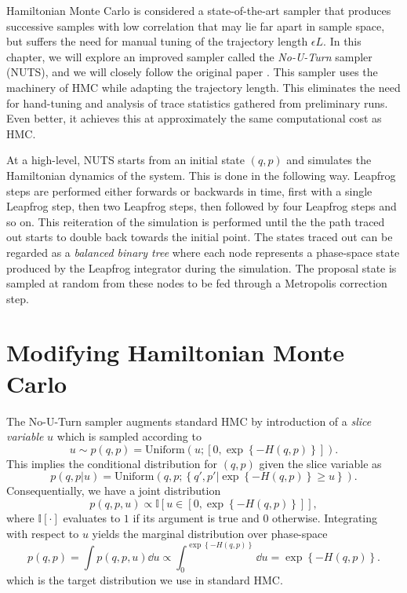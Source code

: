 Hamiltonian Monte Carlo is considered a state-of-the-art sampler that produces successive samples with low correlation
that may lie far apart in sample space, 
but suffers the need for manual tuning of the trajectory length $\epsilon L$. 
In this chapter, we will explore an improved sampler called the \textit{No-U-Turn} sampler (NUTS), and we will closely follow the original paper \cite{nuts}. This sampler uses the machinery of HMC while adapting the trajectory length. This eliminates the need for hand-tuning and analysis of trace statistics gathered from preliminary runs. Even better, it achieves this at approximately the same computational cost as HMC. 

At a high-level, NUTS starts from an initial state $(q, p)$ and simulates the Hamiltonian dynamics of the system. This is
done in the following way. Leapfrog steps are performed either forwards or backwards in time, first with a single Leapfrog step, then two Leapfrog steps, then followed by four Leapfrog steps and so on. This reiteration of the simulation is performed until the the path traced out starts to double back towards the initial point. The states traced out can be regarded as a \textit{balanced binary tree} where
each node represents a phase-space state produced by the Leapfrog integrator during the simulation. The proposal state is sampled at random from these nodes to be fed through a Metropolis correction step. 



\section{Modifying Hamiltonian Monte Carlo}
The No-U-Turn sampler augments standard HMC by introduction of a \textit{slice variable} $u$ which is sampled according to
\begin{equation}
    u \sim p(q, p) = \text{Uniform}\left(u; \left[0, \exp\left\{-H(q, p)\right\}\right]\right).
\end{equation} 
This implies the conditional distribution for $(q, p)$ given the slice variable as
\begin{equation}
    p(q, p|u) = \text{Uniform}\left( q, p; \left\{q', p' \bigg| \exp\left\{-H(q, p)\right\} \geq u \right\} \right).
\end{equation}
Consequentially, we have a joint distribution 
\begin{equation}
    p(q, p, u) \propto \mathbb{I}\left[u \in \left[0, \exp\left\{-H(q, p)\right\}\right]\right],
\end{equation}
where $\mathbb{I}[\cdot]$ evaluates to $1$ if its argument is true and $0$ otherwise. 
Integrating with respect to $u$ yields the marginal distribution
over phase-space
\begin{equation}
    p(q, p) = \int p(q, p, u) \dd u \propto \int_0^{\exp\left\{-H(q, p)\right\}}\dd u = \exp\left\{-H(q, p)\right\}.
\end{equation}
which is the target distribution we use in standard HMC.

